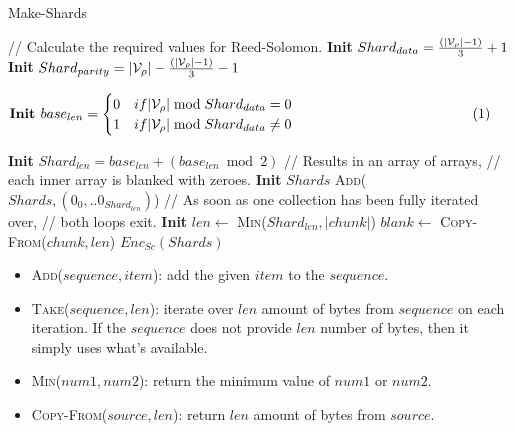 \begin{algorithm}[H]
  \caption[]{\sc Make-Shards}
  \label{algo-make-shards}
  \begin{algorithmic}[1]
    \Statex // Calculate the required values for Reed-Solomon.
    \State \textbf{Init} $Shard_{data} = \frac{(|\mathcal{V}_\rho| - 1)}{3} + 1$
    \State \textbf{Init} $Shard_{parity} = |\mathcal{V}_\rho| - \frac{(|\mathcal{V}_\rho| - 1)}{3} - 1$
    \State $\vcenter{
      \begin{flalign*}
        &\textbf{Init } base_{len} =
        \begin{cases}
          0 & if |\paraValidSet| \bmod{Shard_{data}} = 0 \\
          1 & if |\paraValidSet| \bmod{Shard_{data}} \neq 0
        \end{cases}&
      \end{flalign*}
    }$
    \State \textbf{Init} $Shard_{len} = base_{len} + (base_{len} \bmod{2})$
    \Statex
    \Statex // Results in an array of arrays,
    \Statex // each inner array is blanked with zeroes.
    \State \textbf{Init} $Shards$
      \State \textsc{Add}($Shards, (0_0, ..0_{Shard_{len}})$)
    \EndFor
    \Statex
    \Statex // As soon as one collection has been fully iterated over,
    \Statex // both loops exit.
      \State \textbf{Init} $len \leftarrow$ \textsc{Min}($Shard_{len}, |chunk|$)
      \State $blank \leftarrow$ \textsc{Copy-From}($chunk, len$)
    \EndFor
    \Statex
    \State \Return $Enc_{Sc}(Shards)$
  \end{algorithmic}
\end{algorithm}

\begin{itemize}
  \item \textsc{Add($sequence, item$)}: add the given $item$ to the $sequence$.
  \item \textsc{Take($sequence, len$)}: iterate over $len$ amount of bytes from
  $sequence$ on each iteration. If the $sequence$ does not provide $len$ number
  of bytes, then it simply uses what's available.
  \item \textsc{Min($num1, num2$)}: return the minimum value of $num1$ or
  $num2$.
  \item \textsc{Copy-From($source, len$)}: return $len$ amount of bytes from
  $source$.
\end{itemize}

